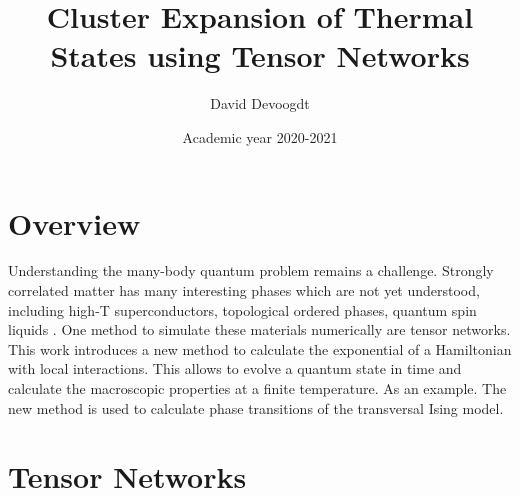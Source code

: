 \documentclass[twocolumn]{article}
\title{Cluster Expansion of Thermal States using Tensor
Networks}
\author{David Devoogdt}
\date{Academic year 2020-2021}
\newcounter{a}
\newcounter{b}
\begin{document}



\maketitle

\begin{abstract}
    
\end{abstract}

\section{Overview}

Understanding the many-body quantum problem remains a challenge. Strongly correlated matter has many interesting phases which are not yet understood, including high-T superconductors, topological ordered phases, quantum spin liquids \cite{Orus2014}. One method to simulate these materials numerically are tensor networks. This work introduces a new method to calculate the exponential of a Hamiltonian with local interactions. This allows to evolve a quantum state in time and calculate the macroscopic properties at a finite temperature. As an example. The new method is used to calculate phase transitions of the transversal Ising model.

\section{Tensor Networks}
\end{document}
